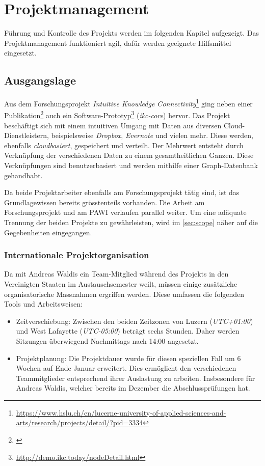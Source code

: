 \chapter{Projektmanagement}

Führung und Kontrolle des Projekts werden im folgenden Kapitel aufgezeigt. Das Projektmanagement funktioniert agil, dafür werden geeignete Hilfsmittel eingesetzt. 

\section{Ausgangslage}
Aus dem Forschungsprojekt \textit{Intuitive Knowledge Connectivity}\footnote{\url{https://www.hslu.ch/en/lucerne-university-of-applied-sciences-and-arts/research/projects/detail/?pid=3334}} ging neben einer Publikation\footnote{\cite{ikcpaper:hslu}} auch ein Software-Prototyp\footnote{\url{http://demo.ikc.today/nodeDetail.html}} (\textit{ikc-core}) hervor. Das Projekt beschäftigt sich mit einem intuitiven Umgang mit Daten aus diversen Cloud-Dienstleistern, beispielsweise \textit{Dropbox}, \textit{Evernote} und vielen mehr. Diese werden, ebenfalls \textit{cloudbasiert}, gespeichert und verteilt. Der Mehrwert entsteht durch Verknüpfung der verschiedenen Daten zu einem gesamtheitlichen Ganzen. Diese Verknüpfungen sind be\-nutzer\-bas\-iert und werden mithilfe einer Graph-Datenbank gehandhabt.

Da beide Projektarbeiter ebenfalls am Forschungsprojekt tätig sind, ist das Grundlagewissen bereits grösstenteils vorhanden. Die Arbeit am Forschungsprojekt und am PAWI verlaufen parallel weiter. Um eine adäquate Trennung der beiden Projekte zu gewährleisten, wird im \autoref{sec:scope} näher auf die Gegebenheiten eingegangen.

\subsection{Internationale Projektorganisation}
\label{subsec:international}
Da mit Andreas Waldis ein Team-Mitglied während des Projekts in den Vereinigten Staaten im Austauschsemester weilt, müssen einige zusätzliche organisatorische Massnahmen ergriffen werden. Diese umfassen die folgenden Tools und Arbeitsweisen:
\begin{itemize}
\item Zeitverschiebung: Zwischen den beiden Zeitzonen von Luzern (\textit{UTC+01:00}) und West Lafayette (\textit{UTC-05:00}) beträgt sechs Stunden. Daher werden Sitzungen überwiegend Nachmittags nach 14:00 angesetzt. 
\item Projektplanung: Die Projektdauer wurde für diesen speziellen Fall um 6 Wochen auf Ende Januar erweitert. Dies ermöglicht den verschiedenen Teammitglieder entsprechend ihrer Auslastung zu arbeiten. Insbesondere für Andreas Waldis, welcher bereits im Dezember die Abschlussprüfungen hat. 
\end{itemize}

